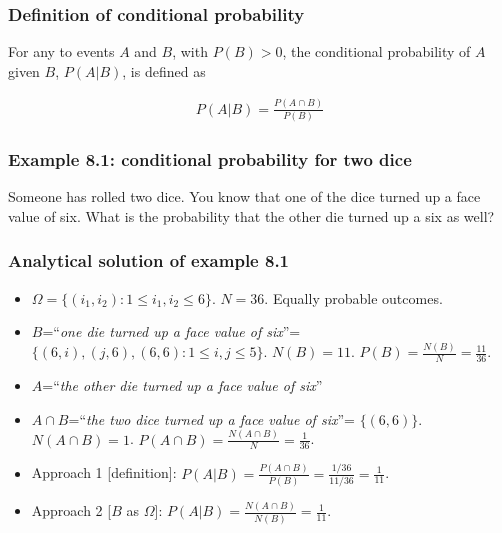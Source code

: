 \begin{frame}
    \frametitle{Definition of conditional probability}

    \begin{probDef}

		For any to events $A$ and $B$, with $P(B)>0$, the conditional
probability of $A$ given $B$, $P(A|B)$, is defined as 

		\begin{align*}
			P(A|B)=\frac{P(A\cap B)}{P(B)}
		\end{align*}

	\end{probDef}

\end{frame}

\begin{frame}
    \frametitle{Example 8.1: conditional probability for two dice}

	\begin{manualProbExample}{8.1}
		Someone has rolled two dice. You know that one of the dice turned up a
face value of six. What is the probability that the other die turned up a six
as  well?
	\end{manualProbExample}

\end{frame}

\begin{frame}
    \frametitle{Analytical solution of example 8.1}

    \begin{itemize}[<+->]

		\item $\Omega=\{(i_1,i_2): 1\le i_1,i_2\le6\}$. $N=36$. Equally probable outcomes.

		\item $B$=``\textit{one die turned up a face value of six}''=
$\{(6,i),(j,6),(6,6):1\le i,j\le 5\}$. $N(B)=11$. $P(B)=\frac{N(B)}{N}=\frac{11}{36}$.

		\item $A$=``\textit{the other die turned up a face value of six}''

		\item $A\cap B$=``\textit{the two dice turned up a face value of six}''=
$\{(6,6)\}$. $N(A\cap B)=1$. $P(A\cap B)=\frac{N(A\cap B)}{N}=\frac{1}{36}$.

		\item Approach 1 [definition]: $P(A|B)=\frac{P(A\cap B)}{P(B)}=\frac{1/36}{11/36}=\frac{1}{11}$.

		\item Approach 2 [$B$ as $\Omega$]: $P(A|B)=\frac{N(A\cap B)}{N(B)}=\frac{1}{11}$.

    \end{itemize}

\end{frame}

